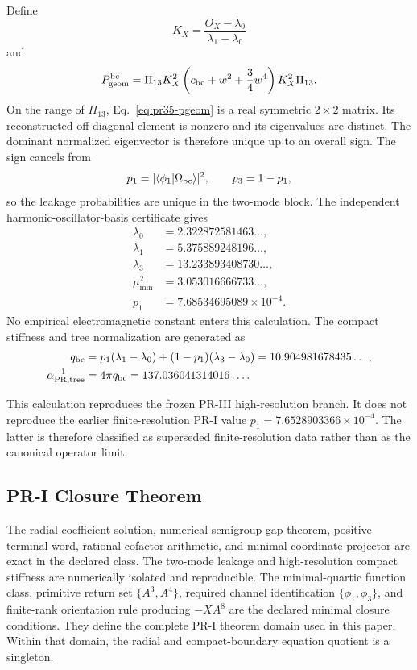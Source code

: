 Define
\begin{equation}
K_X
=
\frac{O_X-\lambda_0}{\lambda_1-\lambda_0}
\end{equation}
and
\begin{equation}
P_{\rm geom}^{\rm bc}
=
\Pi_{13}K_X^2
\left(c_{\rm bc}+w^2+\frac34w^4\right)
K_X^2\Pi_{13}.
\label{eq:pr35-pgeom}
\end{equation}
On the range of \(\Pi_{13}\), Eq.~\eqref{eq:pr35-pgeom} is a real
symmetric $2\times2$ matrix.  Its reconstructed off-diagonal element is
nonzero and its eigenvalues are distinct.  The dominant normalized eigenvector
is therefore unique up to an overall sign.  The sign cancels from
\begin{equation}
p_1
=
|\langle\phi_1|\Omega_{\rm bc}\rangle|^2,
\qquad
p_3=1-p_1,
\end{equation}
so the leakage probabilities are unique in the two-mode block. The independent harmonic-oscillator-basis certificate gives
\begin{align}
\lambda_0&=2.322872581463\ldots,\\
\lambda_1&=5.375889248196\ldots,\\
\lambda_3&=13.233893408730\ldots,\\
\mu_{\min}^2&=3.053016666733\ldots,\\
p_1&=7.68534695089\times10^{-4}.
\end{align}
No empirical electromagnetic constant enters this calculation.  The compact
stiffness and tree normalization are generated as
\begin{align}
q_{\rm bc}
&=
p_1(\lambda_1-\lambda_0)
+(1-p_1)(\lambda_3-\lambda_0)
=10.904981678435\ldots,\\
\alpha_{\rm PR,tree}^{-1}
&=4\pi q_{\rm bc}
=137.036041314016\ldots .
\label{eq:pr35-alpha-tree-regenerated}
\end{align}

This calculation reproduces the frozen PR-III high-resolution branch.  It
does not reproduce the earlier finite-resolution PR-I value
\(p_1=7.6528903366\times10^{-4}\).  The latter is therefore classified as
superseded finite-resolution data rather than as the canonical operator limit.

\subsection{PR-I Closure Theorem}
\label{subsec:pr35-pr1-rigidity-boundary}

The radial coefficient solution, numerical-semigroup gap theorem, positive
terminal word, rational cofactor arithmetic, and minimal coordinate projector
are exact in the declared class.  The two-mode leakage and high-resolution
compact stiffness are numerically isolated and reproducible.  The
minimal-quartic function class, primitive return set \(\{A^3,A^4\}\), required
channel identification \(\{\phi_1,\phi_3\}\), and finite-rank orientation rule
producing \(-XA^8\) are the declared minimal closure conditions.  They define
the complete PR-I theorem domain used in this paper.  Within that domain, the
radial and compact-boundary equation quotient is a singleton.
